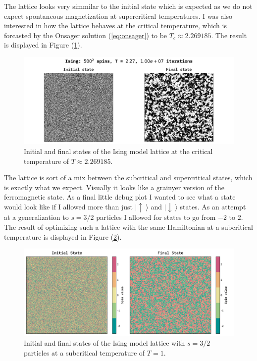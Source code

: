 \documentclass[10pt, titlepage, a4paper]{article}
\newcommand{\ra}{\rangle}
\newcommand{\ua}{\uparrow\>}
\newcommand{\da}{\downarrow\>}
\begin{document}
The lattice looks very simmilar to the initial state which is expected as we do not expect spontaneous magnetization at supercritical temperatures.
I was also interested in how the lattice behaves at the critical temperature, which is forcasted by the Onsager solution (\ref{eq:onsager}) to be
$T_c\approx 2.269185$. The result is displayed in Figure (\ref{fig:ising-demo-critical}).

\begin{figure}[H]
    \centering
    \includegraphics[width=.95\textwidth]{../IsingModel/Images/ising-demo-critical.png}
    \caption{Initial and final states of the Ising model lattice at the critical temperature of $T\approx 2.269185$.}
    \label{fig:ising-demo-critical}
\end{figure}

The lattice is sort of a mix between the subcritical and supercritical states, which is exactly what we expect. Visually it looks like a grainyer
version of the ferromagnetic state. As a final little debug plot I wanted to see what a state would look like if I allowed more than just 
$|\ua\ra$ and $|\da\ra$ states. As an attempt at a generalization to $s=3/2$ particles I allowed for states to go from $-2$ to $2$. The result of 
optimizing such a lattice with the same Hamiltonian at a subcritical temperature is displayed in Figure (\ref{fig:ising-demo-3/2-subcrit}).

\begin{figure}[H]
    \centering
    \includegraphics[width=.95\textwidth]{../IsingModel/Images/expanded-state-subcritical.png}
    \caption{Initial and final states of the Ising model lattice with $s=3/2$ particles at a subcritical temperature of $T=1$.}
    \label{fig:ising-demo-3/2-subcrit}
\end{figure}
\end{document}
